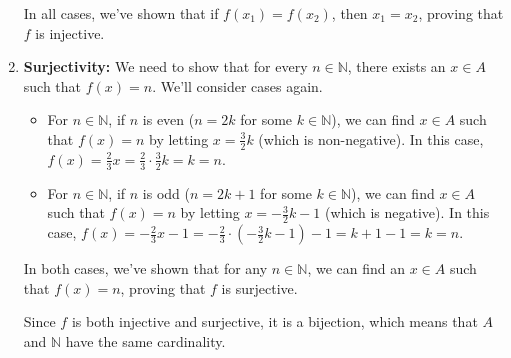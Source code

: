 \documentclass{article}
\theoremstyle{definition}
\begin{document}
\begin{solution}
\begin{enumerate}
\begin{itemize}
\end{itemize}

In all cases, we've shown that if $f(x_1) = f(x_2)$, then $x_1 = x_2$, proving that $f$ is injective.

\item \textbf{Surjectivity:} We need to show that for every $n \in \mathbb{N}$, there exists an $x \in A$ such that $f(x) = n$. We'll consider cases again.

\begin{itemize}
\item For $n \in \mathbb{N}$, if $n$ is even ($n = 2k$ for some $k \in \mathbb{N}$), we can find $x \in A$ such that $f(x) = n$ by letting $x = \frac{3}{2}k$ (which is non-negative). In this case, $f(x) = \frac{2}{3}x = \frac{2}{3} \cdot \frac{3}{2}k = k = n$.

\item For $n \in \mathbb{N}$, if $n$ is odd ($n = 2k + 1$ for some $k \in \mathbb{N}$), we can find $x \in A$ such that $f(x) = n$ by letting $x = -\frac{3}{2}k - 1$ (which is negative). In this case, $f(x) = -\frac{2}{3}x - 1 = -\frac{2}{3} \cdot \left(-\frac{3}{2}k - 1\right) - 1 = k + 1 - 1 = k = n$.

\end{itemize}

In both cases, we've shown that for any $n \in \mathbb{N}$, we can find an $x \in A$ such that $f(x) = n$, proving that $f$ is surjective.

Since $f$ is both injective and surjective, it is a bijection, which means that $A$ and $\mathbb{N}$ have the same cardinality.
\end{enumerate}
\end{solution}
\end{document}
